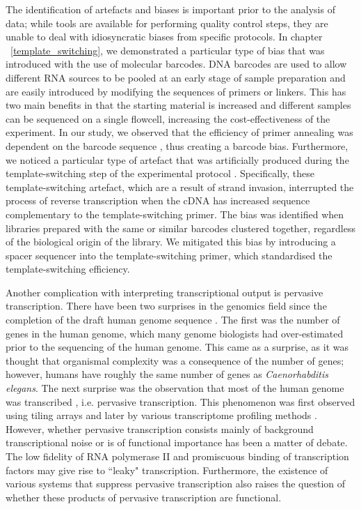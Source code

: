 The identification of artefacts and biases is important prior to the analysis of data; while tools \citep{pmid19737799} are available for performing quality control steps, they are unable to deal with idiosyncratic biases from specific protocols. In chapter ~\ref{template_switching}, we demonstrated a particular type of bias that was introduced with the use of molecular barcodes. DNA barcodes are used to allow different RNA sources to be pooled at an early stage of sample preparation and are easily introduced by modifying the sequences of primers or linkers. This has two main benefits in that the starting material is increased and different samples can be sequenced on a single flowcell, increasing the cost-effectiveness of the experiment. In our study, we observed that the efficiency of primer annealing was dependent on the barcode sequence \citep{Tang01022013}, thus creating a barcode bias. Furthermore, we noticed a particular type of artefact that was artificially produced during the template-switching step of the experimental protocol \citep{Tang01022013}. Specifically, these template-switching artefact, which are a result of strand invasion, interrupted the process of reverse transcription when the cDNA has increased sequence complementary to the template-switching primer. The bias was identified when libraries prepared with the same or similar barcodes clustered together, regardless of the biological origin of the library. We mitigated this bias by introducing a spacer sequencer into the template-switching primer, which standardised the template-switching efficiency.

Another complication with interpreting transcriptional output is pervasive transcription. There have been two surprises in the genomics field since the completion of the draft human genome sequence \citep{lander2001initial,venter2001sequence}. The first was the number of genes in the human genome, which many genome biologists had over-estimated prior to the sequencing of the human genome. This came as a surprise, as it was thought that organismal complexity was a consequence of the number of genes; however, humans have roughly the same number of genes as \textit{Caenorhabditis elegans}. The next surprise was the observation that most of the human genome was transcribed \citep{pmid11988577, pmid17571346}, i.e. pervasive transcription. This phenomenon was first observed using tiling arrays \citep{pmid17510325} and later by various transcriptome profiling methods \citep{pmid22955620}. However, whether pervasive transcription consists mainly of background transcriptional noise or is of functional importance has been a matter of debate. The low fidelity of RNA polymerase II \citep{pmid17277804} and promiscuous binding of transcription factors \citep{pmid22868264} may give rise to ``leaky" transcription. Furthermore, the existence of various systems that suppress pervasive transcription \citep{pmid24267449} also raises the question of whether these products of pervasive transcription are functional.

